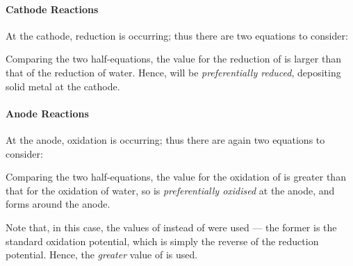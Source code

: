 				\paragraph{Cathode Reactions}

				At the cathode, reduction is occurring; thus there are two equations to consider:


				Comparing the two half-equations, the \Eo{} value for the reduction of  is larger than that of the reduction of water.
				Hence,  will be \textit{preferentially reduced}, depositing solid  metal at the cathode.




				\paragraph{Anode Reactions}

				At the anode, oxidation is occurring; thus there are again two equations to consider:


				Comparing the two half-equations, the \Eox{} value for the oxidation of  is greater than that for
				the oxidation of water, so  is \textit{preferentially oxidised} at the anode, and  forms around the anode.

				Note that, in this case, the values of \Eox{} instead of \Eo{} were used --- the former is the standard oxidation
				potential, which is simply the reverse of the reduction potential. Hence, the \textit{greater} value of \Eox{} is used.

